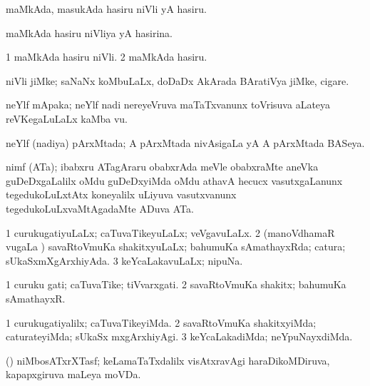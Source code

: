 \bentry
{}
\gl{\nA}
\bmng
maMkAda, masukAda hasiru niVli yA hasiru. 
\emng
\eentry

\bentry
{}
\gl{\gu}
\bmng
maMkAda hasiru niVliya yA hasirina. 
\emng

\noindent
\gl{\pagu}
\bmng
\bnum
\num{1}  maMkAda hasiru niVli. 
\num{2}  maMkAda hasiru. 
\enum
\emng
\eentry

\bentry
{}
\gl{\nA}
\bmng
niVli jiMke; saNaNx koMbuLaLx, doDaDx AkArada BAratiVya jiMke, cigare.  
\emng
\eentry

\bentry
{}
\gl{\nA}
\bmng
neYlf mApaka; neYlf nadi nereyeVruva maTaTxvanunx toVrisuva aLateya reVKegaLuLaLx kaMba \mo vu. 
\emng
\eentry

\bentry
{}
\gl{\gu}
\bmng
neYlf (nadiya) pArxMtada; A pArxMtada nivAsigaLa yA A pArxMtada BASeya. 
\emng
\eentry

\bentry
{}
\gl{\nA}
\bmng
nimf (ATa); ibabxru ATagAraru obabxrAda meVle obabxraMte aneVka guDeDxgaLalilx oMdu guDeDxyiMda oMdu athavA hecucx vasutxgaLanunx tegedukoLuLxtAtx koneyalilx uLiyuva vasutxvanunx tegedukoLuLxvaMtAgadaMte ADuva ATa. 
\emng
\eentry

\bentry
{}
\gl{\gu}
\bmng
\bnum
\num{1} curukugatiyuLaLx; caTuvaTikeyuLaLx; veVgavuLaLx. 
\num{2} (manoVdhamaR \mo vugaLa \vi) savaRtoVmuKa shakitxyuLaLx; bahumuKa sAmathayxRda; catura; sUkaSxmXgArxhiyAda. 
\num{3} keYcaLakavuLaLx; nipuNa. 
\enum
\emng
\eentry

\bentry
{}
\gl{\nA}
\bmng
\bnum
\num{1} curuku gati; caTuvaTike; tiVvarxgati. 
\num{2} savaRtoVmuKa shakitx; bahumuKa sAmathayxR. 
\enum
\emng
\eentry

\bentry
{}
\gl{\kirxvi}
\bmng
\bnum
\num{1} curukugatiyalilx; caTuvaTikeyiMda. 
\num{2} savaRtoVmuKa shakitxyiMda; caturateyiMda; sUkaSx mxgArxhiyAgi. 
\num{3} keYcaLakadiMda; neYpuNayxdiMda. 
\enum
\emng
\eentry

\bentry
{}
\gl{\nA}
\bmng
(\pashA) niMbosATxrXTasf; keLamaTaTxdalilx visAtxravAgi haraDikoMDiruva, kapapxgiruva maLeya moVDa. 
\emng
\eentry

